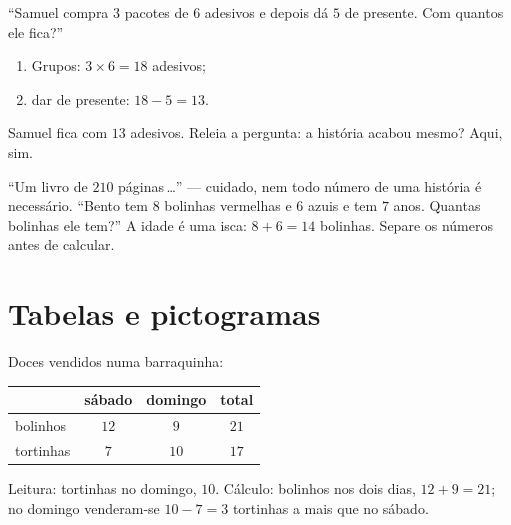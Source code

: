 \begin{example}\label{ex:g2:problems:twostep}
``Samuel compra $3$ pacotes de $6$ adesivos e depois dá $5$ de
presente. Com quantos ele fica?''
\begin{enumerate}
  \item Grupos: $3 \times 6 = 18$ adesivos;
  \item dar de presente: $18 - 5 = 13$.
\end{enumerate}
Samuel fica com $13$ adesivos. Releia a pergunta: a história acabou
mesmo? Aqui, sim.
\end{example}

\begin{example}\label{ex:g2:problems:extra}
``Um livro de $210$ páginas\,\dots'' --- cuidado, nem todo número de
uma história é necessário. ``Bento tem $8$ bolinhas vermelhas e $6$
azuis e tem $7$ anos. Quantas bolinhas ele tem?'' A idade é uma
isca: $8 + 6 = 14$ bolinhas. Separe os números antes de calcular.
\end{example}

\section{Tabelas e pictogramas}

\begin{example}\label{ex:g2:problems:table}
Doces vendidos numa barraquinha:
\begin{center}
\renewcommand{\arraystretch}{1.3}
\begin{tabular}{l|ccc}
 & sábado & domingo & total \\
\hline
bolinhos & $12$ & $9$ & $21$ \\
tortinhas & $7$ & $10$ & $17$ \\
\end{tabular}
\end{center}
Leitura: tortinhas no domingo, $10$. Cálculo: bolinhos nos dois
dias, $12 + 9 = 21$; no domingo venderam-se $10 - 7 = 3$ tortinhas a
mais que no sábado.
\end{example}

